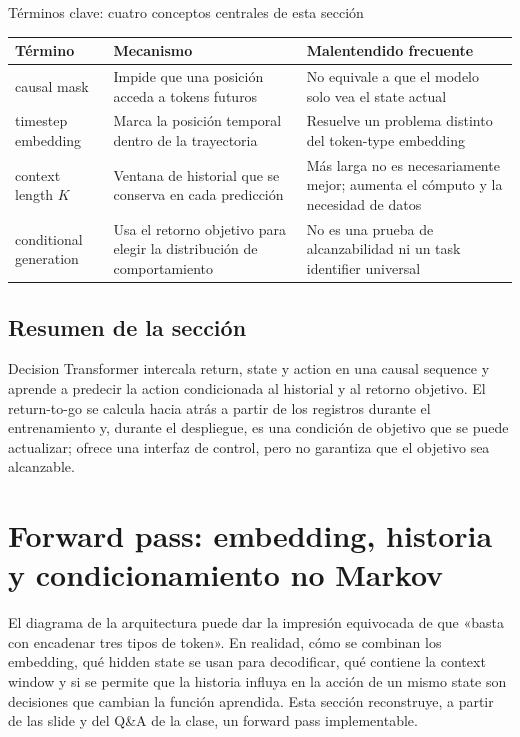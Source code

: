 \documentclass[a4paper]{article}
\begin{document}
\begin{knowledgebox}{Términos clave: cuatro conceptos centrales de esta sección}
\begin{tabularx}{\textwidth}{L{3.0cm} X X}
\toprule
Término & Mecanismo & Malentendido frecuente \\
\midrule
causal mask & Impide que una posición acceda a tokens futuros & No equivale a que el modelo solo vea el state actual \\
timestep embedding & Marca la posición temporal dentro de la trayectoria & Resuelve un problema distinto del token-type embedding \\
context length $K$ & Ventana de historial que se conserva en cada predicción & Más larga no es necesariamente mejor; aumenta el cómputo y la necesidad de datos \\
conditional generation & Usa el retorno objetivo para elegir la distribución de comportamiento & No es una prueba de alcanzabilidad ni un task identifier universal \\
\bottomrule
\end{tabularx}
\end{knowledgebox}

\subsection{Resumen de la sección}

Decision Transformer intercala return, state y action en una causal sequence y aprende a predecir la action condicionada al historial y al retorno objetivo. El return-to-go se calcula hacia atrás a partir de los registros durante el entrenamiento y, durante el despliegue, es una condición de objetivo que se puede actualizar; ofrece una interfaz de control, pero no garantiza que el objetivo sea alcanzable.
\section{Forward pass: embedding, historia y condicionamiento no Markov}

El diagrama de la arquitectura puede dar la impresión equivocada de que «basta con encadenar tres tipos de token». En realidad, cómo se combinan los embedding, qué hidden state se usan para decodificar, qué contiene la context window y si se permite que la historia influya en la acción de un mismo state son decisiones que cambian la función aprendida. Esta sección reconstruye, a partir de las slide y del Q\&A de la clase, un forward pass implementable.
\end{document}
